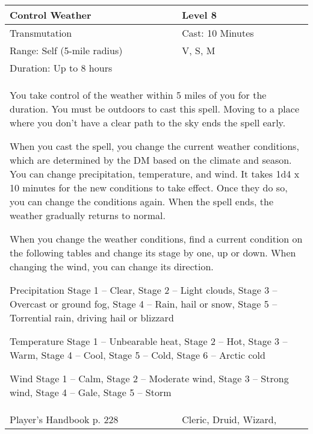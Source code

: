 \documentclass[11pt]{report}
\begin{document}
\begin{table}[H]
	\begin{tabular}{||p{6cm}|p{6cm}||}
		\hline\hline
		\bf{Control Weather} & Level 8\\ \hline
		Transmutation & Cast: 10 Minutes\\ \hline
		Range: Self (5-mile radius) & V, S, M\\ \hline
		Duration: Up to 8 hours & \\ \hline
		\multicolumn{2}{||p{12cm}||}{You take control of the weather within 5 miles of you for the duration. 
You must be outdoors to cast this spell. Moving to a place where you don’t have a clear path to the sky ends the spell early. 

When you cast the spell, you change the current weather conditions, which are determined by the DM based on the climate and season. You can change precipitation, temperature, and wind. It takes 1d4 x 10 minutes for the new conditions to take effect. Once they do so, you can change the conditions again. When the spell ends, the weather gradually returns to normal. 

When you change the weather conditions, find a current condition on the following tables and change its stage by one, up or down. When changing the wind, you can change its direction. 

Precipitation 
Stage 1 – Clear, 
Stage 2 – Light clouds, 
Stage 3 – Overcast or ground fog, 
Stage 4 – Rain, hail or snow, 
Stage 5 – Torrential rain, driving hail or blizzard 

Temperature 
Stage 1 – Unbearable heat, 
Stage 2 – Hot, 
Stage 3 – Warm, 
Stage 4 – Cool, 
Stage 5 – Cold, 
Stage 6 – Arctic cold 

Wind 
Stage 1 – Calm, 
Stage 2 – Moderate wind, 
Stage 3 – Strong wind, 
Stage 4 – Gale, 
Stage 5 – Storm}\\ \hline
Player's Handbook p. 228 & Cleric, Druid, Wizard, \\ \hline\hline
	\end{tabular}
\end{table}
\end{document}
